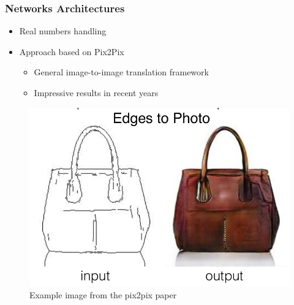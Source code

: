 \documentclass[18pt, xcolor=table]{beamer}
\begin{document}
\begin{frame}[t]
  \frametitle{Networks Architectures}
  \begin{itemize}
  \item Real numbers handling
  \item Approach based on Pix2Pix\footnotemark
    \begin{itemize}
    \item General image-to-image translation framework
    \item Impressive results in recent years
    \end{itemize}
  \end{itemize}

  \begin{center}
    \begin{figure}[htb]
      \includegraphics[scale=0.23]{images/pix2pix_example}
      \vspace{-0.5cm}
      \caption{Example image from the pix2pix paper}
    \end{figure}
  \end{center}

\end{frame}
\end{document}
